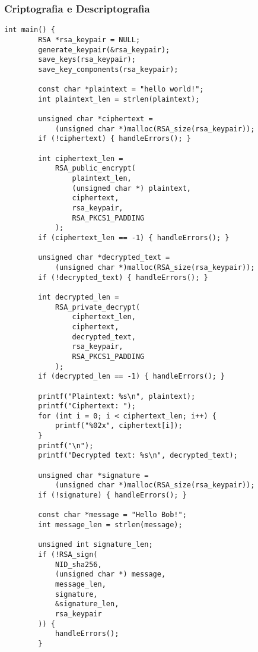 \documentclass[a4paper,12pt]{article}
\begin{document}
\subsubsection*{Criptografia e Descriptografia}
\begin{lstlisting}[style=CStyle]
    int main() {
        RSA *rsa_keypair = NULL;
        generate_keypair(&rsa_keypair);
        save_keys(rsa_keypair);
        save_key_components(rsa_keypair);
    
        const char *plaintext = "hello world!";
        int plaintext_len = strlen(plaintext);
    
        unsigned char *ciphertext = 
            (unsigned char *)malloc(RSA_size(rsa_keypair));
        if (!ciphertext) { handleErrors(); }
    
        int ciphertext_len =
            RSA_public_encrypt(
                plaintext_len,
                (unsigned char *) plaintext,
                ciphertext,
                rsa_keypair,
                RSA_PKCS1_PADDING
            );
        if (ciphertext_len == -1) { handleErrors(); }
    
        unsigned char *decrypted_text =
            (unsigned char *)malloc(RSA_size(rsa_keypair));
        if (!decrypted_text) { handleErrors(); }
    
        int decrypted_len =
            RSA_private_decrypt(
                ciphertext_len,
                ciphertext,
                decrypted_text,
                rsa_keypair,
                RSA_PKCS1_PADDING
            );
        if (decrypted_len == -1) { handleErrors(); }
    
        printf("Plaintext: %s\n", plaintext);
        printf("Ciphertext: ");
        for (int i = 0; i < ciphertext_len; i++) {
            printf("%02x", ciphertext[i]);
        }
        printf("\n");
        printf("Decrypted text: %s\n", decrypted_text);
    
        unsigned char *signature =
            (unsigned char *)malloc(RSA_size(rsa_keypair));
        if (!signature) { handleErrors(); }
    
        const char *message = "Hello Bob!";
        int message_len = strlen(message);
    
        unsigned int signature_len;
        if (!RSA_sign(
            NID_sha256,
            (unsigned char *) message,
            message_len,
            signature,
            &signature_len,
            rsa_keypair
        )) {
            handleErrors();
        }
    

\end{lstlisting}
\end{document}
